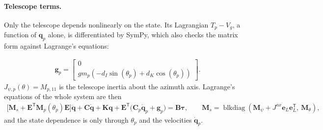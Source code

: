 \documentclass[10pt,a4paper]{article}
\numberwithin{equation}{section}
\begin{document}
\paragraph{Telescope terms.} Only the telescope depends nonlinearly on the state. Its Lagrangian $T_p - V_g$, a function of $\mathbf q_p$ alone, is differentiated by SymPy, which also checks the matrix form against Lagrange's equations:
\begin{center}\end{center}
\begin{center}\end{center}
\begin{gather}\mathbf g_p = \left[\begin{matrix}0\\g m_{p} \left(- d_{I} \sin{\left(\theta_{p} \right)} + d_{K} \cos{\left(\theta_{p} \right)}\right)\end{matrix}\right].\end{gather}
$J_{\psi,p}(\theta) = M_{p,11}$ is the telescope inertia about the azimuth axis. Lagrange's equations of the whole system are then
\begin{gather}
\bigl[\mathbf M_s + \mathbf E^{\mathsf T}\mathbf M_p(\theta_p)\mathbf E\bigr]\ddot{\mathbf q} + \mathbf C\dot{\mathbf q} + \mathbf K\mathbf q + \mathbf E^{\mathsf T}\bigl(\mathbf C_p\dot{\mathbf q}_p + \mathbf g_p\bigr) = \mathbf B\boldsymbol\tau,\qquad \mathbf M_s = \operatorname{blkdiag}(\mathbf M_\psi + J^{ax}\mathbf e_L\mathbf e_L^{\mathsf T},\ \mathbf M_\theta),\label{eq:full_eom}
\end{gather}
and the state dependence is only through $\theta_p$ and the velocities $\dot{\mathbf q}_p$.
\end{document}
